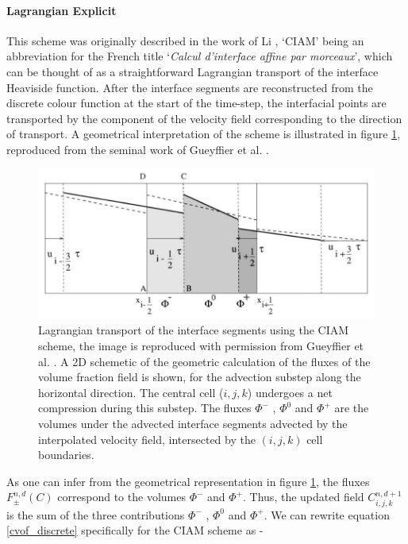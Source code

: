 \paragraph{Lagrangian Explicit} 
This scheme was originally described in the work of Li \cite{li95}, `CIAM' being an 
abbreviation for the French title `\textit{Calcul d'interface affine par morceaux}', 
which can be thought of as a straightforward Lagrangian transport of the interface Heaviside function. 
After the interface segments are reconstructed from the discrete colour function 
at the start of the time-step, the interfacial points are transported by the component of the 
velocity field corresponding to the direction of transport. A geometrical interpretation of the scheme
is illustrated in figure \ref{fig:ciam}, reproduced from the seminal work of Gueyffier et al. \cite{gueyffier}. 

\begin{figure}[!h]
\includegraphics[width=1.0\textwidth]{plots/methodology/ciam.png} 
\caption{
Lagrangian transport of the interface segments using the CIAM scheme, the image
is reproduced with permission from Gueyffier et al. \cite{gueyffier}. 
A 2D schemetic of the geometric calculation of the fluxes of the volume 
fraction field is shown, for the advection substep along the horizontal direction.
The central cell ($i,j,k$) undergoes a net compression during this substep.
The fluxes $\Phi^{-}$ , $\Phi^{0}$ and $\Phi^{+}$ are the volumes under the 
advected interface segments advected by the interpolated velocity field,
intersected by the $(i,j,k)$ cell boundaries.
}
\label{fig:ciam}
\end{figure}

As one can infer from the geometrical representation in figure \ref{fig:ciam}, 
the fluxes $F_{\pm}^{n,d}(C)$ correspond to the volumes $\Phi^{-}$ and $\Phi^{+}$. 
Thus, the updated field $C_{i,j,k}^{n,d+1}$ is the sum of the 
three contributions $\Phi^{-}$ , $\Phi^{0}$ and $\Phi^{+}$. 
We can rewrite equation \ref{cvof_discrete} specifically for the CIAM scheme as -  

